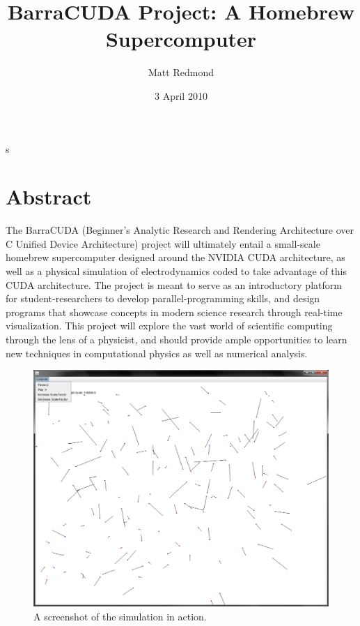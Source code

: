 s\documentclass[10pt]{article}
\title{BarraCUDA Project: A Homebrew Supercomputer}
\author{Matt Redmond}
\date{3 April 2010}
\begin{document}
\maketitle
\section{Abstract}
The BarraCUDA (Beginner's Analytic Research and Rendering Architecture over C Unified Device Architecture) project will ultimately entail a small-scale homebrew supercomputer designed around the NVIDIA CUDA architecture, as well as a physical simulation of electrodynamics coded to take advantage of this CUDA architecture. The project is meant to serve as an introductory platform for student-researchers to develop parallel-programming skills, and design programs that showcase concepts in modern science research through real-time visualization. This project will explore the vast world of scientific computing through the lens of a physicist, and should provide ample opportunities to learn new techniques in computational physics as well as numerical analysis.
\begin{figure}[h]
	\centering
		\includegraphics[scale = 0.35]{barracuda2DScreenshot.png}
	\caption{A screenshot of the simulation in action.}
	\label{fig:barracuda2DScreenshot}
\end{figure}

\clearpage
\tableofcontents
\clearpage
\end{document}
